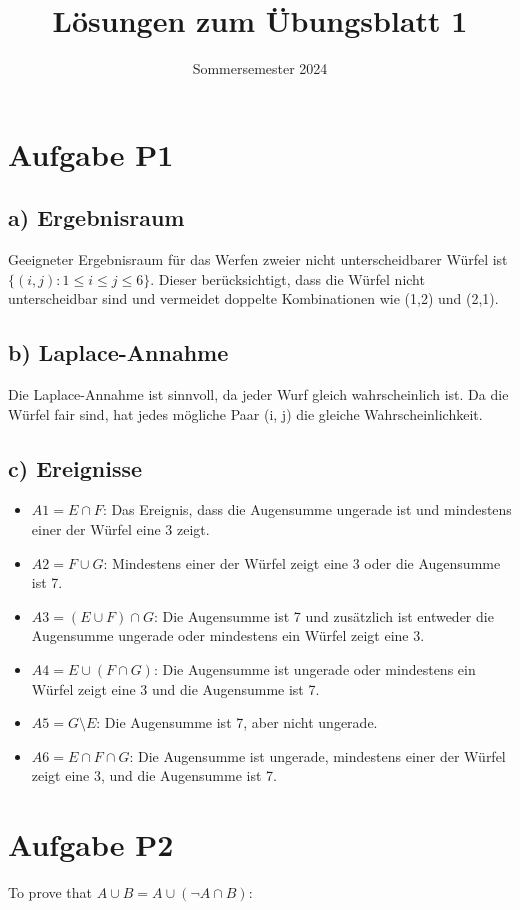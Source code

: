 \documentclass{article}
\title{Lösungen zum Übungsblatt 1}
\author{}
\date{Sommersemester 2024}
\begin{document}
\maketitle

\section*{Aufgabe P1}
\subsection*{a) Ergebnisraum}
Geeigneter Ergebnisraum für das Werfen zweier nicht unterscheidbarer Würfel ist $\{ (i, j) : 1 \leq i \leq j \leq 6 \}$. Dieser berücksichtigt, dass die Würfel nicht unterscheidbar sind und vermeidet doppelte Kombinationen wie (1,2) und (2,1).

\subsection*{b) Laplace-Annahme}
Die Laplace-Annahme ist sinnvoll, da jeder Wurf gleich wahrscheinlich ist. Da die Würfel fair sind, hat jedes mögliche Paar (i, j) die gleiche Wahrscheinlichkeit.

\subsection*{c) Ereignisse}
\begin{itemize}
    \item $A1 = E \cap F$: Das Ereignis, dass die Augensumme ungerade ist und mindestens einer der Würfel eine 3 zeigt.
    \item $A2 = F \cup G$: Mindestens einer der Würfel zeigt eine 3 oder die Augensumme ist 7.
    \item $A3 = (E \cup F) \cap G$: Die Augensumme ist 7 und zusätzlich ist entweder die Augensumme ungerade oder mindestens ein Würfel zeigt eine 3.
    \item $A4 = E \cup (F \cap G)$: Die Augensumme ist ungerade oder mindestens ein Würfel zeigt eine 3 und die Augensumme ist 7.
    \item $A5 = G \setminus E$: Die Augensumme ist 7, aber nicht ungerade.
    \item $A6 = E \cap F \cap G$: Die Augensumme ist ungerade, mindestens einer der Würfel zeigt eine 3, und die Augensumme ist 7.
\end{itemize}

\section*{Aufgabe P2}
To prove that \( A \cup B = A \cup (\neg A \cap B) \):
\end{document}
